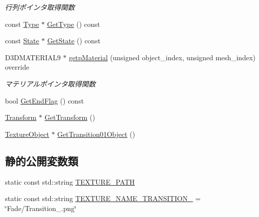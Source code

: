 \begin{DoxyCompactItemize}
\begin{DoxyCompactList}\small\item\em 行列ポインタ取得関数 \end{DoxyCompactList}\item 
const \mbox{\hyperlink{class_fade_ac06f27215b454aa05b93c236476d6e80}{Type}} $\ast$ \mbox{\hyperlink{class_fade_aed5a29d39a5fd6161a9aed73d5f30870}{Get\+Type}} () const
\item 
const \mbox{\hyperlink{class_fade_ae77826bf3ff2ab95fb7b3b6f95cba80a}{State}} $\ast$ \mbox{\hyperlink{class_fade_aeb41dfcadf75dd4c980da68e243cc310}{Get\+State}} () const
\item 
D3\+D\+M\+A\+T\+E\+R\+I\+A\+L9 $\ast$ \mbox{\hyperlink{class_fade_a69db8b97a493082644fbd82c9ef3d1aa}{getp\+Material}} (unsigned object\+\_\+index, unsigned mesh\+\_\+index) override
\begin{DoxyCompactList}\small\item\em マテリアルポインタ取得関数 \end{DoxyCompactList}\item 
bool \mbox{\hyperlink{class_fade_acc8adf28ce2e4270e5fb3907d83dadd0}{Get\+End\+Flag}} () const
\item 
\mbox{\hyperlink{class_transform}{Transform}} $\ast$ \mbox{\hyperlink{class_fade_a1a177209e72a27858ceb2d339321e9c4}{Get\+Transform}} ()
\item 
\mbox{\hyperlink{class_texture_object}{Texture\+Object}} $\ast$ \mbox{\hyperlink{class_fade_a4e047c532d430095e7d0d70288289a82}{Get\+Transition01\+Object}} ()
\end{DoxyCompactItemize}
\subsection*{静的公開変数類}
\begin{DoxyCompactItemize}
\item 
static const std\+::string \mbox{\hyperlink{class_fade_acd9c0d6231180af183d6301f31fa0053}{T\+E\+X\+T\+U\+R\+E\+\_\+\+P\+A\+TH}}
\item 
static const std\+::string \mbox{\hyperlink{class_fade_ab5d6f86f07e33205224fa486ff22c51d}{T\+E\+X\+T\+U\+R\+E\+\_\+\+N\+A\+M\+E\+\_\+\+T\+R\+A\+N\+S\+I\+T\+I\+O\+N\+\_}} = \char`\"{}Fade/Transition\+\_.\+png\char`\"{}
\end{DoxyCompactItemize}
